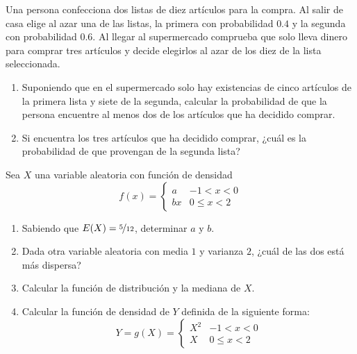 \documentclass[12pt]{article}
\begin{document}
    \begin{ejercicio}[1 punto]
        Una persona confecciona dos listas de diez artículos para la compra. Al salir de casa elige al azar una de las listas, la primera con probabilidad $0.4$ y la segunda con probabilidad $0.6$. Al llegar al supermercado comprueba que solo lleva dinero para comprar tres artículos y decide elegirlos al azar de los diez de la lista seleccionada.
        \begin{enumerate}[label=\alph*)]
            \item Suponiendo que en el supermercado solo hay existencias de cinco artículos de la primera lista y siete de la segunda, calcular la probabilidad de que la persona encuentre al menos dos de los artículos que ha decidido comprar.
            \item Si encuentra los tres artículos que ha decidido comprar, ¿cuál es la probabilidad de que provengan de la segunda lista?
        \end{enumerate}
    \end{ejercicio}

    \begin{ejercicio}[2.5 puntos]
        Sea $X$ una variable aleatoria con función de densidad
        \[
        f(x) = \begin{cases} 
        a & -1 < x < 0 \\ 
        bx & 0 \leq x < 2 
        \end{cases}
        \]
        \begin{enumerate}[label=\alph*)]
            \item Sabiendo que $E(X)=\nicefrac{5}{12}$, determinar $a$ y $b$.
            \item Dada otra variable aleatoria con media $1$ y varianza $2$, ¿cuál de las dos está más dispersa?
            \item Calcular la función de distribución y la mediana de $X$.
            \item Calcular la función de densidad de $Y$ definida de la siguiente forma:
            \[
            Y = g(X) = \begin{cases} 
            X^2 & -1 < x < 0 \\ 
            X & 0 \leq x < 2 
            \end{cases}
            \]
        \end{enumerate}
    \end{ejercicio}
\end{document}
